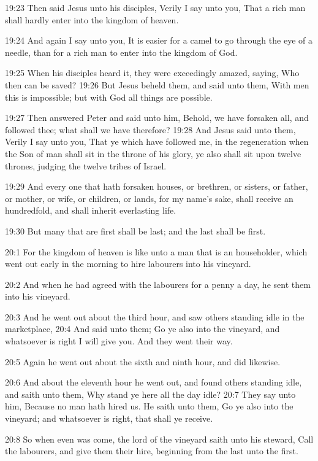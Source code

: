 19:23 Then said Jesus unto his disciples, Verily I say unto you, That
a rich man shall hardly enter into the kingdom of heaven.

19:24 And again I say unto you, It is easier for a camel to go through
the eye of a needle, than for a rich man to enter into the kingdom of
God.

19:25 When his disciples heard it, they were exceedingly amazed,
saying, Who then can be saved?  19:26 But Jesus beheld them, and said
unto them, With men this is impossible; but with God all things are
possible.

19:27 Then answered Peter and said unto him, Behold, we have forsaken
all, and followed thee; what shall we have therefore?  19:28 And Jesus
said unto them, Verily I say unto you, That ye which have followed me,
in the regeneration when the Son of man shall sit in the throne of his
glory, ye also shall sit upon twelve thrones, judging the twelve
tribes of Israel.

19:29 And every one that hath forsaken houses, or brethren, or
sisters, or father, or mother, or wife, or children, or lands, for my
name's sake, shall receive an hundredfold, and shall inherit
everlasting life.

19:30 But many that are first shall be last; and the last shall be
first.

20:1 For the kingdom of heaven is like unto a man that is an
householder, which went out early in the morning to hire labourers
into his vineyard.

20:2 And when he had agreed with the labourers for a penny a day, he
sent them into his vineyard.

20:3 And he went out about the third hour, and saw others standing
idle in the marketplace, 20:4 And said unto them; Go ye also into the
vineyard, and whatsoever is right I will give you. And they went their
way.

20:5 Again he went out about the sixth and ninth hour, and did
likewise.

20:6 And about the eleventh hour he went out, and found others
standing idle, and saith unto them, Why stand ye here all the day
idle?  20:7 They say unto him, Because no man hath hired us. He saith
unto them, Go ye also into the vineyard; and whatsoever is right, that
shall ye receive.

20:8 So when even was come, the lord of the vineyard saith unto his
steward, Call the labourers, and give them their hire, beginning from
the last unto the first.

